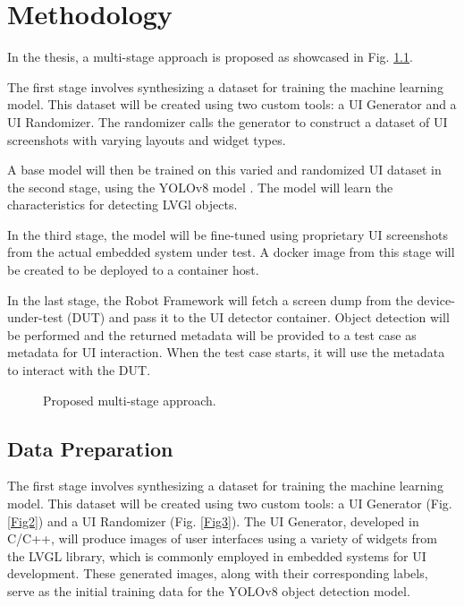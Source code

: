 \documentclass[Proposal,BIC,english,IEEE]{BASE/twbook} %
\begin{document}
\chapter{Methodology}
In the thesis, a multi-stage approach is proposed as showcased in Fig. \ref{Fig1}.

The first stage involves synthesizing a dataset for training the machine learning model. This dataset will be created using two custom tools: a UI Generator and a UI Randomizer. The randomizer calls the generator to construct a dataset of UI screenshots with varying layouts and widget types.

A base model will then be trained on this varied and randomized UI dataset in the second stage, using the YOLOv8 model \autocite{jocherUltralyticsYOLO2023}. The model will learn the characteristics for detecting LVGl objects.

In the third stage, the model will be fine-tuned using proprietary UI screenshots from the actual embedded system under test. A docker image from this stage will be created to be deployed to a container host.

In the last stage, the Robot Framework \autocite{RobotFramework} will fetch a screen dump from the device-under-test (DUT) and pass it to the UI detector container. Object detection will be performed and the returned metadata will be provided to a test case as metadata for UI interaction. When the test case starts, it will use the metadata to interact with the DUT.
\begin{figure}[!htbp]
    \centering
    
    \caption{Proposed multi-stage approach.}\label{Fig1}
\end{figure}
\newpage
\section{Data Preparation}
The first stage involves synthesizing a dataset for training the machine learning model. This dataset will be created using two custom tools: a UI Generator (Fig. \ref{Fig2}) and a UI Randomizer (Fig. \ref{Fig3}). The UI Generator, developed in C/C++, will produce images of user interfaces using a variety of widgets from the LVGL library, which is commonly employed in embedded systems for UI development. These generated images, along with their corresponding labels, serve as the initial training data for the YOLOv8 object detection model.
\end{document}
